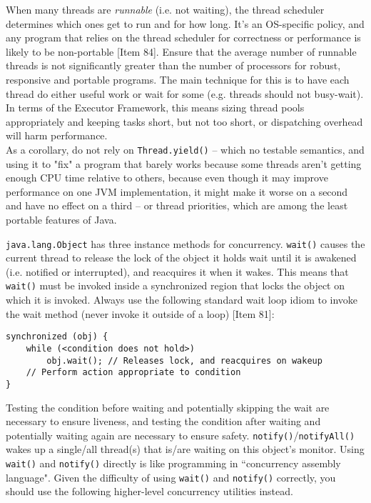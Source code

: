 \documentclass[8pt, table, xcdraw]{article}%
\begin{document}
When many threads are \emph{runnable} (i.e. not waiting), the thread scheduler determines which ones get to run and for how long. It's an OS-specific policy, and any program that relies on the thread scheduler for correctness or performance is likely to be non-portable [Item 84]. Ensure that the average number of runnable threads is not significantly greater than the number of processors for robust, responsive and portable programs. The main technique for this is to have each thread do either useful work or wait for some (e.g. threads should not busy-wait).  In terms of the Executor Framework, this means sizing thread pools appropriately and keeping tasks short, but not too short, or dispatching overhead will harm performance.\\
As a corollary, do not rely on \lstinline{Thread.yield()} -- which no testable semantics, and using it to "fix" a program that barely works because some threads aren’t getting enough CPU time relative to others, because even though it may improve performance on one JVM implementation, it might make it worse on a second and have no effect on a third -- or thread priorities, which are among the least portable features of Java.

\lstinline{java.lang.Object} has three instance methods for concurrency. \lstinline{wait()} causes the current thread to release the lock of the object it holds wait until it is awakened (i.e. notified or interrupted), and reacquires it when it wakes. This means that \lstinline{wait()} must be invoked inside a synchronized region that locks the object on which it is invoked. Always use the following standard wait loop idiom to invoke the wait method (never invoke it outside of a loop) [Item 81]:

\begin{lstlisting}
synchronized (obj) {
    while (<condition does not hold>)
        obj.wait(); // Releases lock, and reacquires on wakeup
    // Perform action appropriate to condition
}
\end{lstlisting}

Testing the condition before waiting and potentially skipping the wait are necessary to ensure liveness, and testing the condition after waiting and potentially waiting again are necessary to ensure safety. \lstinline{notify()}/\lstinline{notifyAll()} wakes up a single/all thread(s) that is/are waiting on this object's monitor. Using \lstinline{wait()} and \lstinline{notify()} directly is like programming in “concurrency assembly language". Given the difficulty of using \lstinline{wait()} and \lstinline{notify()} correctly, you should use the following higher-level concurrency utilities instead.
\end{document}
